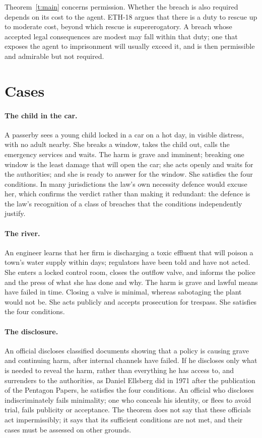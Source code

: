 \documentclass{situationist-preprint}
\begin{document}
\begin{remark}\label{r:required}
Theorem~\ref{t:main} concerns permission. Whether the breach is also required depends on its cost to the agent. ETH-18 argues that there is a duty to rescue up to moderate cost, beyond which rescue is supererogatory. A breach whose accepted legal consequences are modest may fall within that duty; one that exposes the agent to imprisonment will usually exceed it, and is then permissible and admirable but not required.
\end{remark}

\section{Cases}

\paragraph{The child in the car.} A passerby sees a young child locked in a car on a hot day, in visible distress, with no adult nearby. She breaks a window, takes the child out, calls the emergency services and waits. The harm is grave and imminent; breaking one window is the least damage that will open the car; she acts openly and waits for the authorities; and she is ready to answer for the window. She satisfies the four conditions. In many jurisdictions the law's own necessity defence would excuse her, which confirms the verdict rather than making it redundant: the defence is the law's recognition of a class of breaches that the conditions independently justify.

\paragraph{The river.} An engineer learns that her firm is discharging a toxic effluent that will poison a town's water supply within days; regulators have been told and have not acted. She enters a locked control room, closes the outflow valve, and informs the police and the press of what she has done and why. The harm is grave and lawful means have failed in time. Closing a valve is minimal, whereas sabotaging the plant would not be. She acts publicly and accepts prosecution for trespass. She satisfies the four conditions.

\paragraph{The disclosure.} An official discloses classified documents showing that a policy is causing grave and continuing harm, after internal channels have failed. If he discloses only what is needed to reveal the harm, rather than everything he has access to, and surrenders to the authorities, as Daniel Ellsberg did in 1971 after the publication of the Pentagon Papers, he satisfies the four conditions. An official who discloses indiscriminately fails minimality; one who conceals his identity, or flees to avoid trial, fails publicity or acceptance. The theorem does not say that these officials act impermissibly; it says that its sufficient conditions are not met, and their cases must be assessed on other grounds.
\end{document}
